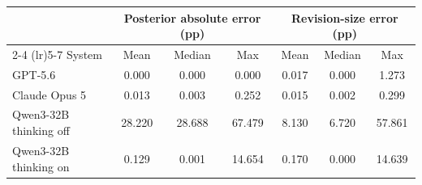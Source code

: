 \begin{tabular}{lcccccc}
\toprule
& \multicolumn{3}{c}{Posterior absolute error (pp)} & \multicolumn{3}{c}{Revision-size error (pp)} \\
\cmidrule(lr){2-4} \cmidrule(lr){5-7}
System & Mean & Median & Max & Mean & Median & Max \\
\midrule
GPT-5.6 & 0.000 & 0.000 & 0.000 & 0.017 & 0.000 & 1.273 \\
Claude Opus 5 & 0.013 & 0.003 & 0.252 & 0.015 & 0.002 & 0.299 \\
Qwen3-32B thinking off & 28.220 & 28.688 & 67.479 & 8.130 & 6.720 & 57.861 \\
Qwen3-32B thinking on & 0.129 & 0.001 & 14.654 & 0.170 & 0.000 & 14.639 \\
\bottomrule
\end{tabular}
